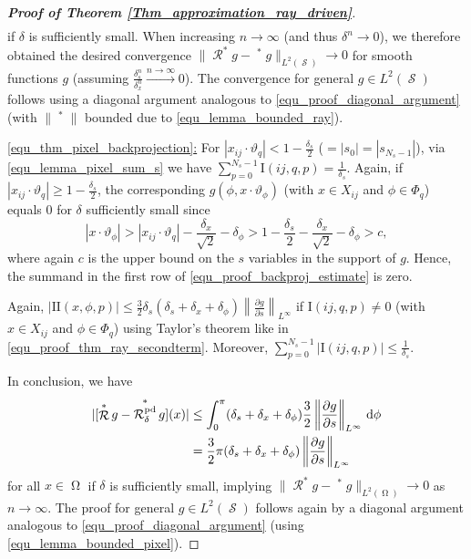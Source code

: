 \documentclass[11pt,reqno]{amsart}
\newcommand{\sums}{\sum_{p=0}^{N_s-1}}
\newcommand{\I}{\mathrm{I}}
\newcommand{\II}{\mathrm{II}}
\DeclareMathOperator{\Radon}{\mathcal{R}}
\DeclareMathOperator{\RayRadon}{\mathcal{R}^\mathrm{rd}_{\delta}}
\DeclareMathOperator{\PixelRadon}{\mathcal{R}^\mathrm{pd}_{\delta}}
\DeclareMathOperator{\RayRadonN}{\mathcal{R}^\mathrm{rd}_{\delta^n}}
\DeclareMathOperator{\PixelRadonN}{\mathcal{R}^\mathrm{pd}_{\delta^n}}
\DeclareMathOperator{\imgdom}{\Omega}
\DeclareMathOperator{\sinodom}{\mathcal{S}}
\newcommand{\dd}[1]{\,\mathrm{d}{#1}}
\numberwithin{theorem}{section}
\theoremstyle{remark}
\begin{document}
\begin{proof}[\textbf{Proof of Theorem \ref{Thm_approximation_ray_driven}}]
\begin{multline}
    \end{multline}   
    if $\delta$ is sufficiently small.
When increasing $n\to \infty$ (and thus $\delta^n\to 0$), we therefore obtained the desired convergence $\|\Radon^* g- \RayRadonN^* g\|_{L^2(\sinodom)}\to 0$ for smooth functions $g$ (assuming $\frac{\delta_s^n}{\delta_x^n} \overset{n\to \infty}{\to} 0 $). The convergence for general $g\in L^2(\sinodom)$ follows using a diagonal argument analogous to \eqref{equ_proof_diagonal_argument} (with $\|\RayRadon^*\|$ bounded due to \eqref{equ_lemma_bounded_ray}).




\underline{\eqref{equ_thm_pixel_backprojection}:} For $|x_{ij}\cdot\vartheta_q|<1-\frac {\delta_s}{2}$ ($=|s_0|=|s_{N_s-1}|$), via \eqref{equ_lemma_pixel_sum_s} we have $\sums \I(ij,q,p)=\frac{1}{\delta_s}$. Again, if $|x_{ij}\cdot\vartheta_q|\geq 1-\frac {\delta_s}{2} $, the corresponding $g(\phi,x\cdot \vartheta_\phi)$ (with $x\in X_{ij}$ and $\phi \in \Phi_q$) equals  $0$ for $\delta$ sufficiently small since 
\begin{equation}
|x\cdot\vartheta_\phi|> |x_{ij}\cdot\vartheta_q| -\frac{\delta_x}{\sqrt{2}}-\delta_\phi> 1 - \frac{\delta_s}{2}-\frac{\delta_x}{\sqrt{2}}-\delta_\phi>c,
\end{equation}
where again $c$ is the upper bound on the $s$ variables in the support of $g$.
Hence, the summand in the first row of \eqref{equ_proof_backproj_estimate} is zero.
 


Again, $|\II (x,\phi,p)|\leq  \frac{3}{2}\delta_s(\delta_s+\delta_x+\delta_\phi)\left \|\frac{\partial g}{\partial s} \right \|_{L^\infty}$ if $\I(ij,q,p)\neq 0$ (with $x\in X_{ij}$ and $\phi \in \Phi_q$) using Taylor's theorem like in \eqref{equ_proof_thm_ray_secondterm}.  Moreover, $\sums |\I(ij,q,p)| \leq \frac{1}{\delta_s}$.


In conclusion, we have
\begin{align}
\label{equ_proof_pixel-driven_backprojection_estimate}
    | [\Radon^* g-\PixelRadon^* g](x) |
    &
    \leq  \int_0^\pi  (\delta_s+\delta_x+\delta_\phi)\frac{3}{2} \left \|\frac{\partial g}{\partial s} \right \|_{L^\infty}\dd \phi\notag
    \\ 
    &
    = \frac{3}{2}\pi (\delta_s+\delta_x+\delta_\phi) \left \|\frac{\partial g}{\partial s} \right \|_{L^\infty}
\end{align}
for all $x\in \imgdom$ if $\delta$ is sufficiently small, implying $\|\Radon^* g-\PixelRadonN^* g\|_{L^2(\imgdom)} \to 0$ as $n\to \infty$.
The proof for general $g\in L^2(\sinodom)$ follows again by a diagonal argument analogous to \eqref{equ_proof_diagonal_argument} (using \eqref{equ_lemma_bounded_pixel}).



\end{proof}
\end{document}
